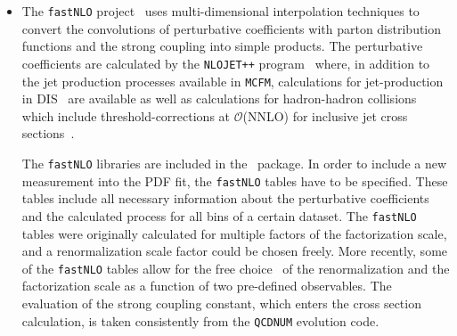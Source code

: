 \begin{description}
\begin{itemize}
\item
    The \texttt{fastNLO} project~\cite{Kluge:2006xs,Wobisch:2011ij,Britzger:2012bs}
uses multi-dimensional interpolation
techniques to convert the convolutions of perturbative 
coefficients with parton distribution functions and 
the strong coupling into simple products.
The perturbative 
coefficients are calculated by the \texttt{NLOJET++}
program~\cite{Nagy:1998bb} where, 
in addition to the jet production processes available in \texttt{MCFM},
calculations for jet-production
in DIS~\cite{Nagy:2001xb} are available as well as calculations for 
hadron-hadron 
collisions~\cite{Nagy:2003tz,Nagy:2001fj} which include
 threshold-corrections 
at $\mathcal{O}$(NNLO) for inclusive jet cross 
sections~\cite{Kidonakis:2000gi}.

The  \texttt{fastNLO}  libraries are included in the \fitter\ package.
In order to include a new measurement into the PDF fit,
the \texttt{fastNLO} tables have to be specified. These tables include all
necessary information about the perturbative coefficients and the
calculated process for all bins of a certain dataset. 
%
The \texttt{fastNLO} tables were originally calculated
for multiple factors of the factorization scale, 
and a renormalization scale factor could be chosen freely.
More recently, some of the \texttt{fastNLO} tables allow for 
the free choice~\cite{Britzger:2012bs} of the renormalization and the factorization
scale as a function of two pre-defined observables.
The evaluation of the strong coupling constant, which enters
the cross section calculation, is taken consistently from the 
\texttt{QCDNUM} evolution code.


\end{itemize}
\end{description}
